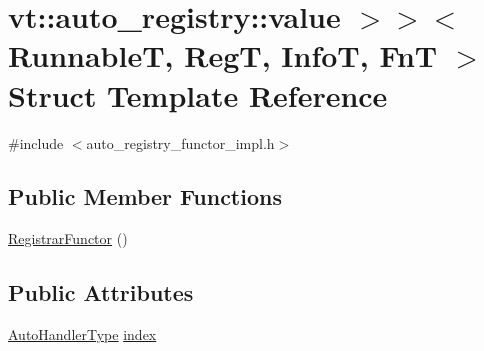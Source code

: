 \hypertarget{structvt_1_1auto__registry_1_1_registrar_functor_3_01_runnable_t_00_01_reg_t_00_01_info_t_00_01_ec57e5bbdf77219785996b8aa3819a29}{}\section{vt\+:\+:auto\+\_\+registry\+:\+:value $>$$>$$<$ RunnableT, RegT, InfoT, FnT $>$ Struct Template Reference}
\label{structvt_1_1auto__registry_1_1_registrar_functor_3_01_runnable_t_00_01_reg_t_00_01_info_t_00_01_ec57e5bbdf77219785996b8aa3819a29}


{\ttfamily \#include $<$auto\+\_\+registry\+\_\+functor\+\_\+impl.\+h$>$}

\subsection*{Public Member Functions}
\begin{DoxyCompactItemize}
\item 
\hyperlink{structvt_1_1auto__registry_1_1_registrar_functor_3_01_runnable_t_00_01_reg_t_00_01_info_t_00_01_ec57e5bbdf77219785996b8aa3819a29_acb5b94751607c69f2a8a9eecf1c1706c}{Registrar\+Functor} ()
\end{DoxyCompactItemize}
\subsection*{Public Attributes}
\begin{DoxyCompactItemize}
\item 
\hyperlink{namespacevt_1_1auto__registry_ae295e18699146815bb7d7674594d95d7}{Auto\+Handler\+Type} \hyperlink{structvt_1_1auto__registry_1_1_registrar_functor_3_01_runnable_t_00_01_reg_t_00_01_info_t_00_01_ec57e5bbdf77219785996b8aa3819a29_ab57e90a096ad7a4800ab26e5da4249bb}{index}
\end{DoxyCompactItemize}



